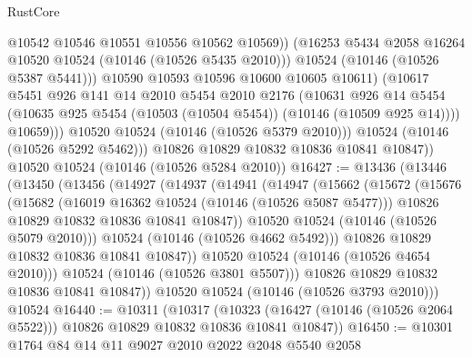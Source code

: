 \begin{lexlean}{RustCore}
\begin{coremodule}
                        @10542
                        @10546
                        @10551
                        @10556
                        @10562
                        @10569))
                    (@16253 @5434 @2058 @16264 @10520 @10524 (@10146 (@10526 @5435 @2010)))
                    @10524
                    (@10146 (@10526 @5387 @5441)))
                  @10590
                  @10593
                  @10596
                  @10600
                  @10605
                  @10611)
                (@10617
                  @5451
                  @926
                  @141
                  @14
                  @2010
                  @5454
                  @2010
                  @2176
                  (@10631
                    @926
                    @14
                    @5454
                    (@10635 @925 @5454 (@10503 (@10504 @5454)) (@10146 (@10509 @925 @14))))
                  @10659)))
            @10520
            @10524
            (@10146 (@10526 @5379 @2010)))
          @10524
          (@10146 (@10526 @5292 @5462)))
        @10826
        @10829
        @10832
        @10836
        @10841
        @10847))
    @10520
    @10524
    (@10146 (@10526 @5284 @2010))
@16427 := @13436
    (@13446
      (@13450
        (@13456
          (@14927
            (@14937
              (@14941
                (@14947
                  (@15662
                    (@15672
                      (@15676
                        (@15682
                          (@16019 @16362 @10524 (@10146 (@10526 @5087 @5477)))
                          @10826
                          @10829
                          @10832
                          @10836
                          @10841
                          @10847))
                      @10520
                      @10524
                      (@10146 (@10526 @5079 @2010)))
                    @10524
                    (@10146 (@10526 @4662 @5492)))
                  @10826
                  @10829
                  @10832
                  @10836
                  @10841
                  @10847))
              @10520
              @10524
              (@10146 (@10526 @4654 @2010)))
            @10524
            (@10146 (@10526 @3801 @5507)))
          @10826
          @10829
          @10832
          @10836
          @10841
          @10847))
      @10520
      @10524
      (@10146 (@10526 @3793 @2010)))
    @10524
@16440 := @10311
    (@10317
      (@10323 (@16427 (@10146 (@10526 @2064 @5522))) @10826 @10829 @10832 @10836 @10841 @10847))
@16450 := @10301 @1764 @84 @14 @11 @9027 @2010 @2022 @2048 @5540 @2058

\end{coremodule}
\end{lexlean}
